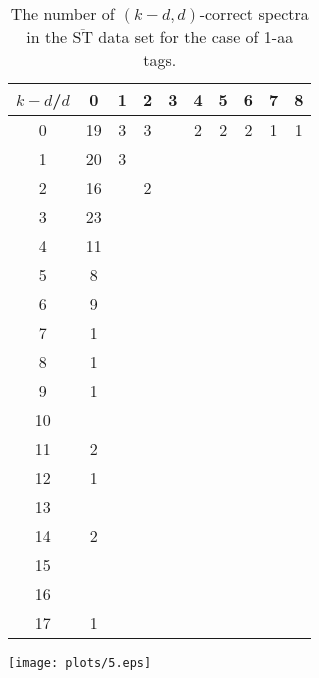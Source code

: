 \documentclass{article}
\def\STbar{{\overline{\mathrm{ST}}}}
\begin{document}
\begin{table}[h]\footnotesize
{\centering
\begin{tabular}{|c|c|
c|c|c|c|c|c|c|c|}
  \hline
  $k-d$/$d$ 
 & 0 & 1 & 2 & 3 & 4 & 5 & 6 & 7 & 8\\

  \hline
  \hline

0  & 19 & 3 & 3 &  & 2 & 2 & 2 & 1 & 1\\

1  & 20 & 3 &  &  &  &  &  &  & \\

2  & 16 &  & 2 &  &  &  &  &  & \\

3  & 23 &  &  &  &  &  &  &  & \\

4  & 11 &  &  &  &  &  &  &  & \\

5  & 8 &  &  &  &  &  &  &  & \\

6  & 9 &  &  &  &  &  &  &  & \\

7  & 1 &  &  &  &  &  &  &  & \\

8  & 1 &  &  &  &  &  &  &  & \\

9  & 1 &  &  &  &  &  &  &  & \\

10  &  &  &  &  &  &  &  &  & \\

11  & 2 &  &  &  &  &  &  &  & \\

12  & 1 &  &  &  &  &  &  &  & \\

13  &  &  &  &  &  &  &  &  & \\

14  & 2 &  &  &  &  &  &  &  & \\

15  &  &  &  &  &  &  &  &  & \\

16  &  &  &  &  &  &  &  &  & \\

17  & 1 &  &  &  &  &  &  &  & \\

  \hline
\end{tabular}
\par}
\centering
\caption{The number of $(k-d,d)$-correct spectra in the $\STbar$ data set for the case of 1-aa tags.}
\vspace{3mm}
\label{table:kd-1-ST}
\end{table}
\texttt{[image: plots/5.eps]}
\end{document}
